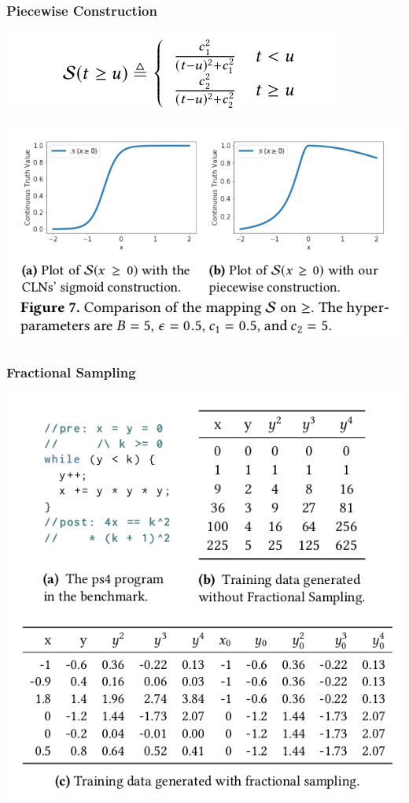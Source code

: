 \documentclass[11pt]{beamer}
\begin{document}
\begin{frame}\frametitle{Piecewise Construction}
\begin{center}
\includegraphics[scale=0.5]{9.png}

\includegraphics[scale=0.4]{10.png}
\end{center}


\end{frame}

\begin{frame}\frametitle{Fractional Sampling}
\begin{center}
\includegraphics[scale=0.4]{11.png}
\end{center}
\end{frame}
\end{document}
